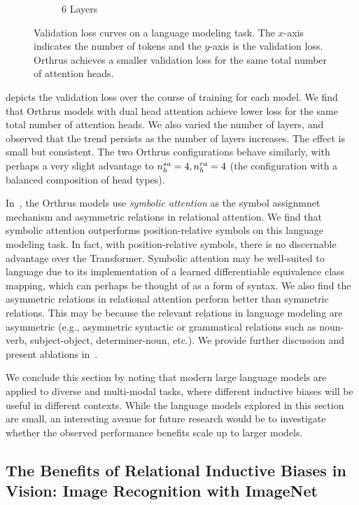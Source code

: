 \begin{figure}[ht]
\begin{subfigure}{0.33\textwidth}
        \caption{6 Layers}
    \end{subfigure}
    \caption{Validation loss curves on a language modeling task. The $x$-axis indicates the number of tokens and the $y$-axis is the validation loss. Orthrus achieves a smaller validation loss for the same total number of attention heads.}\label{fig:tiny_stories_val_loss_curves}
\end{figure}

 depicts the validation loss over the course of training for each model. We find that Orthrus models with dual head attention achieve lower loss for the same total number of attention heads. We also varied the number of layers, and observed that the trend persists as the number of layers increases. The effect is small but consistent. The two Orthrus configurations behave similarly, with perhaps a very slight advantage to $n_h^{sa} = 4, n_h^{ra} = 4$ (the configuration with a balanced composition of head types).

In~, the Orthrus models use \textit{symbolic attention} as the symbol assignmnet mechanism and asymmetric relations in relational attention. We find that symbolic attention outperforms position-relative symbols on this language modeling task. In fact, with position-relative symbols, there is no discernable advantage over the Transformer. Symbolic attention may be well-suited to language due to its implementation of a learned differentiable equivalence class mapping, which can perhaps be thought of as a form of syntax. We also find the asymmetric relations in relational attention perform better than symmetric relations. This may be because the relevant relations in language modeling are asymmetric (e.g., asymmetric syntactic or grammatical relations such as noun-verb, subject-object, determiner-noun, etc.). We provide further discussion and present ablations in~.

We conclude this section by noting that modern large language models are applied to diverse and multi-modal tasks, where different inductive biases will be useful in different contexts. While the language models explored in this section are small, an interesting avenue for future research would be to investigate whether the observed performance benefits scale up to larger models.

\subsection{The Benefits of Relational Inductive Biases in Vision: Image Recognition with ImageNet}\label{ssec:imagenett}

